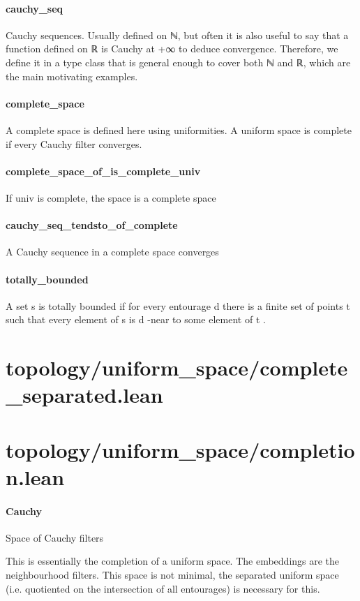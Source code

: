 \documentclass{article}
\begin{document}
\paragraph{cauchy\_seq}
\par
Cauchy sequences. Usually defined on ℕ, but often it is also useful to say that a function
defined on ℝ is Cauchy at +∞ to deduce convergence. Therefore, we define it in a type class that
is general enough to cover both ℕ and ℝ, which are the main motivating examples.
\paragraph{complete\_space}
\par
A complete space is defined here using uniformities. A uniform space
is complete if every Cauchy filter converges.
\paragraph{complete\_space\_of\_is\_complete\_univ}
\par
If 
\colorbox[RGB]{253,246,227}{{{{\color[RGB]{101, 123, 131} univ }}}} is complete, the space is a complete space
\paragraph{cauchy\_seq\_tendsto\_of\_complete}
\par
A Cauchy sequence in a complete space converges
\paragraph{totally\_bounded}
\par
A set 
\colorbox[RGB]{253,246,227}{{{{\color[RGB]{101, 123, 131} s }}}} is totally bounded if for every entourage 
\colorbox[RGB]{253,246,227}{{{{\color[RGB]{101, 123, 131} d }}}} there is a finite
set of points 
\colorbox[RGB]{253,246,227}{{{{\color[RGB]{101, 123, 131} t }}}} such that every element of 
\colorbox[RGB]{253,246,227}{{{{\color[RGB]{101, 123, 131} s }}}} is 
\colorbox[RGB]{253,246,227}{{{{\color[RGB]{101, 123, 131} d }}}}-near to some element of 
\colorbox[RGB]{253,246,227}{{{{\color[RGB]{101, 123, 131} t }}}}.
\section{topology/uniform\_space/complete\_separated.lean}\section{topology/uniform\_space/completion.lean}\paragraph{Cauchy}
\par
Space of Cauchy filters
\par
This is essentially the completion of a uniform space. The embeddings are the neighbourhood filters.
This space is not minimal, the separated uniform space (i.e. quotiented on the intersection of all
entourages) is necessary for this.
\end{document}
